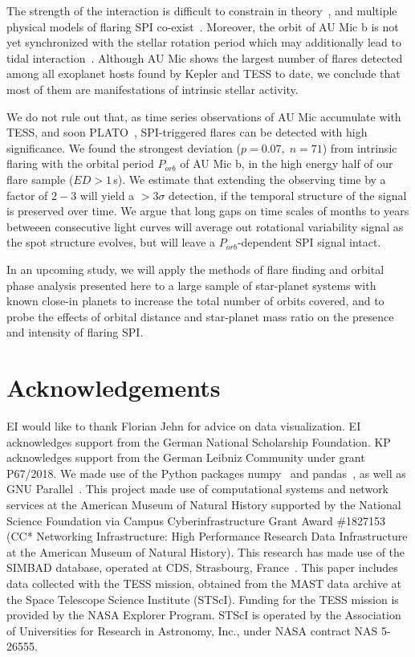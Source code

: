 \documentclass[fleqn,usenatbib]{mnras}%
\begin{document}
The strength of the interaction is difficult to constrain in theory~\citep{strugarek2019}, and multiple physical models of flaring SPI co-exist~\citep{lanza2018close-by, saur2013magnetic}. Moreover, the orbit of AU Mic b is not yet synchronized with the stellar rotation period which may additionally lead to tidal interaction~\citep{cuntz2000stellar}. Although AU Mic shows the largest number of flares detected among all exoplanet hosts found by Kepler and TESS to date, we conclude that most of them are manifestations of intrinsic stellar activity. 

We do not rule out that, as time series observations of AU Mic accumulate with TESS, and soon PLATO~\citep{rauer2014plato}, SPI-triggered flares can be detected with high significance. We found the strongest deviation \mbox{($p=0.07,\;n=71$)} from intrinsic flaring with the orbital period $P_{orb}$ of AU Mic b, in the high energy half of our flare sample ($ED>1$\,s). We estimate that extending the observing time by a factor of $2-3$ will yield a $>3\sigma$ detection, if the temporal structure of the signal is preserved over time. We argue that long gaps on time scales of months to years betweeen consecutive light curves will average out rotational variability signal as the spot structure evolves, but will leave a $P_{orb}$-dependent SPI signal intact. 

In an upcoming study, we will apply the methods of flare finding and orbital phase analysis presented here to a large sample of star-planet systems with known close-in planets to increase the total number of orbits covered, and to probe the effects of orbital distance and star-planet mass ratio on the presence and intensity of flaring SPI.
\section*{Acknowledgements}
EI would like to thank Florian Jehn for advice on data visualization. EI acknowledges support from the German National Scholarship Foundation. KP acknowledges support from the German Leibniz Community under grant P67/2018. We made use of the Python packages numpy~\citep{numpy2020} and pandas~\citep{pandas2010,pandas2020software}, as well as GNU Parallel~\citep{tange2018gnu}. This project made use of computational systems and network services at the American Museum of Natural History supported by the National Science Foundation via Campus Cyberinfrastructure Grant Award \#1827153 (CC* Networking Infrastructure: High Performance Research Data Infrastructure at the American Museum of Natural History). This research has made use of the SIMBAD database, operated at CDS, Strasbourg, France~\citep{wenger2000}. This paper includes data collected with the TESS mission, obtained from the MAST data archive at the Space Telescope Science Institute (STScI). Funding for the TESS mission is provided by the NASA Explorer Program. STScI is operated by the Association of Universities for Research in Astronomy, Inc., under NASA contract NAS 5-26555.
\end{document}
